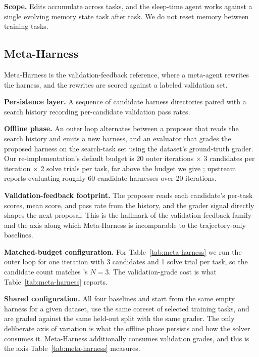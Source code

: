 \noindent\textbf{Scope.}
Edits accumulate across tasks, and the sleep-time agent works against a single evolving memory state task after task.
We do not reset memory between training tasks.

\subsection{Meta-Harness \citep{lee2026metaharness}}

Meta-Harness is the validation-feedback reference, where a meta-agent rewrites the harness, and the rewrites are scored against a labeled validation set.

\noindent\textbf{Persistence layer.}
A sequence of candidate harness directories paired with a search history recording per-candidate validation pass rates.

\noindent\textbf{Offline phase.}
An outer loop alternates between a proposer that reads the search history and emits a new harness, and an evaluator that grades the proposed harness on the search-task set using the dataset's ground-truth grader.
Our re-implementation's default budget is 20 outer iterations $\times$ 3 candidates per iteration $\times$ 2 solve trials per task, far above the budget we give \method{}; upstream reports evaluating roughly 60 candidate harnesses over 20 iterations.

\noindent\textbf{Validation-feedback footprint.}
The proposer reads each candidate's per-task scores, mean score, and pass rate from the history, and the grader signal directly shapes the next proposal.
This is the hallmark of the validation-feedback family and the axis along which Meta-Harness is incomparable to the trajectory-only baselines.

\noindent\textbf{Matched-budget configuration.}
For Table~\ref{tab:meta-harness} we run the outer loop for one iteration with 3 candidates and 1 solve trial per task, so the candidate count matches \method{}'s $N=3$.
The validation-grade cost is what Table~\ref{tab:meta-harness} reports.

\noindent\textbf{Shared configuration.}
All four baselines and \method{} start from the same empty harness for a given dataset, use the same coreset of selected training tasks, and are graded against the same held-out split with the same grader.
The only deliberate axis of variation is what the offline phase persists and how the solver consumes it.
Meta-Harness additionally consumes validation grades, and this is the axis Table~\ref{tab:meta-harness} measures.
